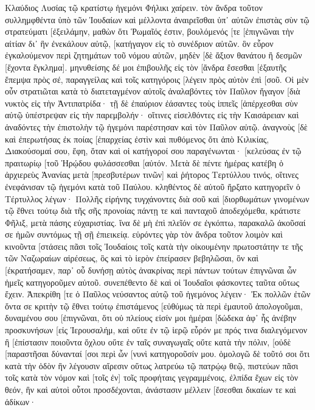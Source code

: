 Κλαύδιος Λυσίας τῷ κρατίστῳ ἡγεμόνι Φήλικι χαίρειν. 
τὸν ἄνδρα τοῦτον συλλημφθέντα ὑπὸ τῶν Ἰουδαίων καὶ μέλλοντα ἀναιρεῖσθαι ὑπ᾽ αὐτῶν ἐπιστὰς σὺν τῷ στρατεύματι [ἐξειλάμην, μαθὼν ὅτι Ῥωμαῖός ἐστιν, 
βουλόμενός [τε [ἐπιγνῶναι τὴν αἰτίαν δι᾽ ἣν ἐνεκάλουν αὐτῷ, [κατήγαγον εἰς τὸ συνέδριον αὐτῶν. 
ὃν εὗρον ἐγκαλούμενον περὶ ζητημάτων τοῦ νόμου αὐτῶν, μηδὲν [δὲ ἄξιον θανάτου ἢ δεσμῶν [ἔχοντα ἔγκλημα]. 
μηνυθείσης δέ μοι ἐπιβουλῆς εἰς τὸν [ἄνδρα ἔσεσθαι [ἐξαυτῆς ἔπεμψα πρὸς σέ, παραγγείλας καὶ τοῖς κατηγόροις [λέγειν πρὸς αὐτὸν ἐπὶ [σοῦ. 
Οἱ μὲν οὖν στρατιῶται κατὰ τὸ διατεταγμένον αὐτοῖς ἀναλαβόντες τὸν Παῦλον ἤγαγον [διὰ νυκτὸς εἰς τὴν Ἀντιπατρίδα· 
τῇ δὲ ἐπαύριον ἐάσαντες τοὺς ἱππεῖς [ἀπέρχεσθαι σὺν αὐτῷ ὑπέστρεψαν εἰς τὴν παρεμβολήν· 
οἵτινες εἰσελθόντες εἰς τὴν Καισάρειαν καὶ ἀναδόντες τὴν ἐπιστολὴν τῷ ἡγεμόνι παρέστησαν καὶ τὸν Παῦλον αὐτῷ. 
ἀναγνοὺς [δὲ καὶ ἐπερωτήσας ἐκ ποίας [ἐπαρχείας ἐστὶν καὶ πυθόμενος ὅτι ἀπὸ Κιλικίας, 
Διακούσομαί σου, ἔφη, ὅταν καὶ οἱ κατήγοροί σου παραγένωνται· [κελεύσας ἐν τῷ πραιτωρίῳ [τοῦ Ἡρῴδου φυλάσσεσθαι [αὐτόν. 
Μετὰ δὲ πέντε ἡμέρας κατέβη ὁ ἀρχιερεὺς Ἁνανίας μετὰ [πρεσβυτέρων τινῶν] καὶ ῥήτορος Τερτύλλου τινός, οἵτινες ἐνεφάνισαν τῷ ἡγεμόνι κατὰ τοῦ Παύλου. 
κληθέντος δὲ αὐτοῦ ἤρξατο κατηγορεῖν ὁ Τέρτυλλος λέγων· Πολλῆς εἰρήνης τυγχάνοντες διὰ σοῦ καὶ [διορθωμάτων γινομένων τῷ ἔθνει τούτῳ διὰ τῆς σῆς προνοίας 
πάντῃ τε καὶ πανταχοῦ ἀποδεχόμεθα, κράτιστε Φῆλιξ, μετὰ πάσης εὐχαριστίας. 
ἵνα δὲ μὴ ἐπὶ πλεῖόν σε ἐγκόπτω, παρακαλῶ ἀκοῦσαί σε ἡμῶν συντόμως τῇ σῇ ἐπιεικείᾳ. 
εὑρόντες γὰρ τὸν ἄνδρα τοῦτον λοιμὸν καὶ κινοῦντα [στάσεις πᾶσι τοῖς Ἰουδαίοις τοῖς κατὰ τὴν οἰκουμένην πρωτοστάτην τε τῆς τῶν Ναζωραίων αἱρέσεως, 
ὃς καὶ τὸ ἱερὸν ἐπείρασεν βεβηλῶσαι, ὃν καὶ [ἐκρατήσαμεν, 
παρ᾽ οὗ δυνήσῃ αὐτὸς ἀνακρίνας περὶ πάντων τούτων ἐπιγνῶναι ὧν ἡμεῖς κατηγοροῦμεν αὐτοῦ. 
συνεπέθεντο δὲ καὶ οἱ Ἰουδαῖοι φάσκοντες ταῦτα οὕτως ἔχειν. 
Ἀπεκρίθη [τε ὁ Παῦλος νεύσαντος αὐτῷ τοῦ ἡγεμόνος λέγειν· Ἐκ πολλῶν ἐτῶν ὄντα σε κριτὴν τῷ ἔθνει τούτῳ ἐπιστάμενος [εὐθύμως τὰ περὶ ἐμαυτοῦ ἀπολογοῦμαι, 
δυναμένου σου [ἐπιγνῶναι, ὅτι οὐ πλείους εἰσίν μοι ἡμέραι [δώδεκα ἀφ᾽ ἧς ἀνέβην προσκυνήσων [εἰς Ἰερουσαλήμ, 
καὶ οὔτε ἐν τῷ ἱερῷ εὗρόν με πρός τινα διαλεγόμενον ἢ [ἐπίστασιν ποιοῦντα ὄχλου οὔτε ἐν ταῖς συναγωγαῖς οὔτε κατὰ τὴν πόλιν, 
[οὐδὲ [παραστῆσαι δύνανταί [σοι περὶ ὧν [νυνὶ κατηγοροῦσίν μου. 
ὁμολογῶ δὲ τοῦτό σοι ὅτι κατὰ τὴν ὁδὸν ἣν λέγουσιν αἵρεσιν οὕτως λατρεύω τῷ πατρῴῳ θεῷ, πιστεύων πᾶσι τοῖς κατὰ τὸν νόμον καὶ [τοῖς ἐν] τοῖς προφήταις γεγραμμένοις, 
ἐλπίδα ἔχων εἰς τὸν θεόν, ἣν καὶ αὐτοὶ οὗτοι προσδέχονται, ἀνάστασιν μέλλειν [ἔσεσθαι δικαίων τε καὶ ἀδίκων· 
